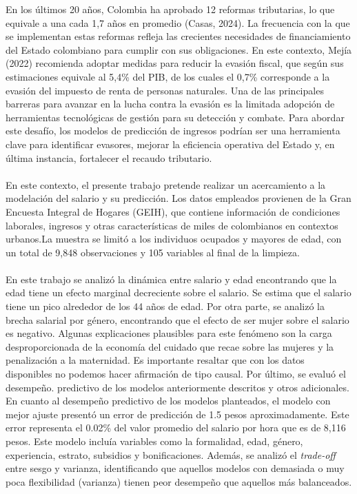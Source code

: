 \documentclass[article,11 pt]{article}
\begin{document}
En los últimos 20 años, Colombia ha aprobado 12 reformas tributarias, lo que equivale a una cada 1,7 años en promedio (Casas, 2024). La frecuencia con la que se implementan estas reformas refleja las crecientes necesidades de financiamiento del Estado colombiano para cumplir con sus obligaciones. En este contexto, Mejía (2022) recomienda adoptar medidas para reducir la evasión fiscal, que según sus estimaciones equivale al 5,4\% del PIB, de los cuales el 0,7\% corresponde a la evasión del impuesto de renta de personas naturales. Una de las principales barreras para avanzar en la lucha contra la evasión es la limitada adopción de herramientas tecnológicas de gestión para su detección y combate. Para abordar este desafío, los modelos de predicción de ingresos podrían ser una herramienta clave para identificar evasores, mejorar la eficiencia operativa del Estado y, en última instancia, fortalecer el recaudo tributario. 
\\
\\
En este contexto, el presente trabajo pretende realizar un acercamiento a la modelación del salario y su predicción. Los datos empleados provienen de la Gran Encuesta Integral de Hogares (GEIH), que contiene información de condiciones laborales, ingresos y otras características de miles de colombianos en contextos urbanos.La muestra se limitó a los individuos ocupados y mayores de edad, con un total de 9,848 observaciones y 105 variables al final de la limpieza.
\\
\\
En este trabajo se analizó la dinámica entre salario y edad encontrando que la edad tiene un efecto marginal decreciente sobre el salario. Se estima que el salario tiene un pico alrededor de los 44 años de edad. Por otra parte, se analizó la brecha salarial por género, encontrando que el efecto de ser mujer sobre el salario es negativo. Algunas explicaciones plausibles para este fenómeno son la carga desproporcionada de la economía del cuidado que recae sobre las mujeres y la penalización a la maternidad. Es importante resaltar que con los datos disponibles no podemos hacer afirmación de tipo causal. Por último, se evaluó el desempeño. predictivo de los modelos anteriormente descritos y otros adicionales. En cuanto al desempeño predictivo de los modelos planteados, el modelo con mejor ajuste presentó un error de predicción de 1.5 pesos aproximadamente. Este error representa el 0.02\% del valor promedio del salario por hora que es de 8,116 pesos. Este modelo incluía variables como la formalidad, edad, género, experiencia, estrato, subsidios y bonificaciones. Además, se analizó el \textit{trade-off} entre sesgo y varianza, identificando que aquellos modelos con demasiada o muy poca flexibilidad (varianza) tienen peor desempeño que aquellos más balanceados.
\end{document}
